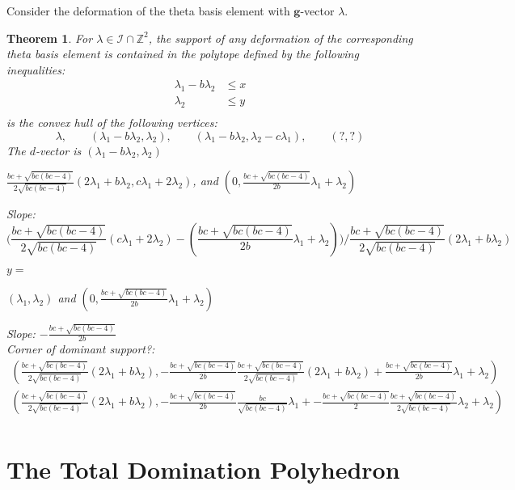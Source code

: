 \documentclass{amsart}
\newtheorem{theorem}{Theorem}
\numberwithin{theorem}{section}
\newcommand{\bfg}{\boldsymbol{g}}
\newcommand{\cI}{\mathcal{I}}
\newcommand{\ZZ}{\mathbb{Z}}
\begin{document}
  Consider the deformation of the theta basis element with $\bfg$-vector $\lambda$.
  \begin{theorem}
    For $\lambda\in\cI\cap\ZZ^2$, the support of any deformation of the corresponding theta basis element is contained in the polytope defined by the following inequalities:
    \begin{align*}
       \lambda_1-b\lambda_2 &\le x\\
       \lambda_2 &\le y\\
    \end{align*}
    is the convex hull of the following vertices:
    \[\lambda, \qquad (\lambda_1-b\lambda_2,\lambda_2), \qquad (\lambda_1-b\lambda_2,\lambda_2-c\lambda_1), \qquad (?,?)\]
    The $d$-vector is $(\lambda_1-b\lambda_2,\lambda_2)$

    $\frac{bc+\sqrt{bc(bc-4)}}{2\sqrt{bc(bc-4)}}(2\lambda_1+b\lambda_2,c\lambda_1+2\lambda_2)$, and $(0,\frac{bc+\sqrt{bc(bc-4)}}{2b}\lambda_1+\lambda_2)$

    Slope:
    \[\big(\frac{bc+\sqrt{bc(bc-4)}}{2\sqrt{bc(bc-4)}}(c\lambda_1+2\lambda_2)-(\frac{bc+\sqrt{bc(bc-4)}}{2b}\lambda_1+\lambda_2)\big) /\frac{bc+\sqrt{bc(bc-4)}}{2\sqrt{bc(bc-4)}}(2\lambda_1+b\lambda_2)\]

    $y=$

    $(\lambda_1,\lambda_2)$ and $(0,\frac{bc+\sqrt{bc(bc-4)}}{2b}\lambda_1+\lambda_2)$
    
    Slope: $-\frac{bc+\sqrt{bc(bc-4)}}{2b}$\\

    Corner of dominant support?: 
    \begin{align*}
      \left(\frac{bc+\sqrt{bc(bc-4)}}{2\sqrt{bc(bc-4)}}(2\lambda_1+b\lambda_2),-\frac{bc+\sqrt{bc(bc-4)}}{2b}\frac{bc+\sqrt{bc(bc-4)}}{2\sqrt{bc(bc-4)}}(2\lambda_1+b\lambda_2)+\frac{bc+\sqrt{bc(bc-4)}}{2b}\lambda_1+\lambda_2\right)\\
      \left(\frac{bc+\sqrt{bc(bc-4)}}{2\sqrt{bc(bc-4)}}(2\lambda_1+b\lambda_2),-\frac{bc+\sqrt{bc(bc-4)}}{2b}\frac{bc}{\sqrt{bc(bc-4)}}\lambda_1+-\frac{bc+\sqrt{bc(bc-4)}}{2}\frac{bc+\sqrt{bc(bc-4)}}{2\sqrt{bc(bc-4)}}\lambda_2+\lambda_2\right)\\
    \end{align*}
    
  \end{theorem}


  \section{The Total Domination Polyhedron}
\end{document}
